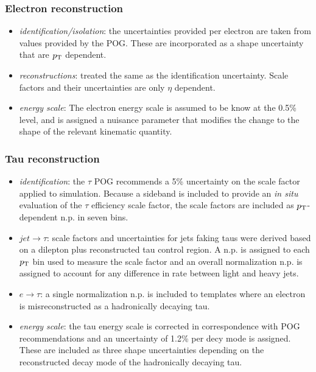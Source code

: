 \subsubsection{Electron reconstruction}
    \begin{itemize}
        \item \textit{identification/isolation}: the uncertainties
            provided per electron are taken from values provided by the
            POG.  These are incorporated as a shape uncertainty that are
            $p_{\mathrm{T}}$ dependent.
        \item \textit{reconstructions}: treated the same as the
            identification uncertainty.  Scale factors and their
            uncertainties are only $\eta$ dependent. 
        \item \textit{energy scale}: The electron energy scale is
            assumed to be know at the 0.5\% level, and is assigned a
            nuisance parameter that modifies the change to the shape of
            the relevant kinematic quantity.
    \end{itemize}

\subsubsection{Tau reconstruction}
    \begin{itemize}
        \item \textit{identification}: the $\tau$ POG recommends a 5\%
            uncertainty on the scale factor applied to simulation.
            Because a sideband is included to provide an \emph{in situ}
            evaluation of the $\tau$ efficiency scale factor, the scale
            factors are included as $p_{\mathrm{T}}$-dependent n.p. in seven \pt
            bins.
        \item \textit{$jet\rightarrow\tau$}: scale factors and
            uncertainties for jets faking taus were derived based on a
            dilepton plus reconstructed tau control region.  A n.p. is
            assigned to each $p_{\mathrm{T}}$ bin used to measure the scale factor
            and an overall normalization n.p. is assigned to account for
            any difference in rate between light and heavy jets.
        \item \textit{$e\rightarrow\tau$}: a single normalization n.p.
            is included to templates where an electron is
            misreconstructed as a hadronically decaying tau.
        \item \textit{energy scale}: the tau energy scale is corrected in
            correspondence with POG recommendations and an uncertainty
            of 1.2\% per decy mode is assigned.  These are included as
            three shape uncertainties depending on the reconstructed
            decay mode of the hadronically decaying tau.
    \end{itemize}

